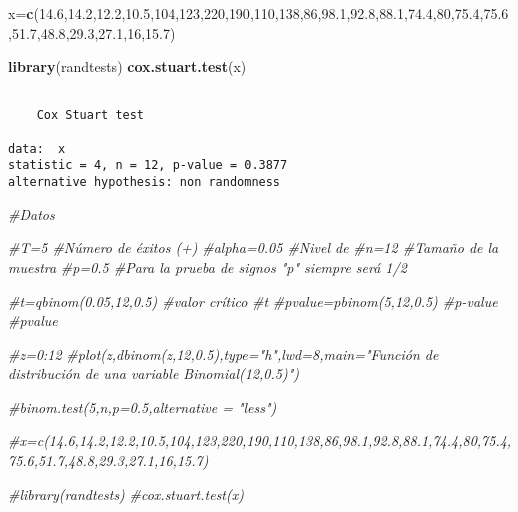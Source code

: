 \documentclass[a4paper,oneside,openany]{book}
\newenvironment{Shaded}{\begin{snugshade}}{\end{snugshade}}
\newcommand{\KeywordTok}[1]{\textcolor[rgb]{0.13,0.29,0.53}{\textbf{#1}}}
\newcommand{\DecValTok}[1]{\textcolor[rgb]{0.00,0.00,0.81}{#1}}
\newcommand{\FloatTok}[1]{\textcolor[rgb]{0.00,0.00,0.81}{#1}}
\newcommand{\CommentTok}[1]{\textcolor[rgb]{0.56,0.35,0.01}{\textit{#1}}}
\newcommand{\NormalTok}[1]{#1}
\begin{document}
\begin{Shaded}
\begin{Highlighting}[]
\NormalTok{x=}\KeywordTok{c}\NormalTok{(}\FloatTok{14.6}\NormalTok{,}\FloatTok{14.2}\NormalTok{,}\FloatTok{12.2}\NormalTok{,}\FloatTok{10.5}\NormalTok{,}\DecValTok{104}\NormalTok{,}\DecValTok{123}\NormalTok{,}\DecValTok{220}\NormalTok{,}\DecValTok{190}\NormalTok{,}\DecValTok{110}\NormalTok{,}\DecValTok{138}\NormalTok{,}\DecValTok{86}\NormalTok{,}\FloatTok{98.1}\NormalTok{,}\FloatTok{92.8}\NormalTok{,}\FloatTok{88.1}\NormalTok{,}\FloatTok{74.4}\NormalTok{,}\DecValTok{80}\NormalTok{,}\FloatTok{75.4}\NormalTok{,}\FloatTok{75.6}\NormalTok{,}\FloatTok{51.7}\NormalTok{,}\FloatTok{48.8}\NormalTok{,}\FloatTok{29.3}\NormalTok{,}\FloatTok{27.1}\NormalTok{,}\DecValTok{16}\NormalTok{,}\FloatTok{15.7}\NormalTok{)}


\KeywordTok{library}\NormalTok{(randtests)}
\KeywordTok{cox.stuart.test}\NormalTok{(x)}
\end{Highlighting}
\end{Shaded}

\begin{verbatim}

    Cox Stuart test

data:  x
statistic = 4, n = 12, p-value = 0.3877
alternative hypothesis: non randomness
\end{verbatim}

\begin{Shaded}
\begin{Highlighting}[]
\CommentTok{#Datos}

\CommentTok{#T=5              #Número de éxitos (+)}
\CommentTok{#alpha=0.05       #Nivel de }
\CommentTok{#n=12              #Tamaño de la muestra }
\CommentTok{#p=0.5            #Para la prueba de signos "p" siempre será 1/2}


\CommentTok{#t=qbinom(0.05,12,0.5)           #valor crítico}
\CommentTok{#t}
\CommentTok{#pvalue=pbinom(5,12,0.5)         #p-value      }
\CommentTok{#pvalue}

\CommentTok{#z=0:12}
\CommentTok{#plot(z,dbinom(z,12,0.5),type="h",lwd=8,main="Función de distribución de una variable Binomial(12,0.5)")}


\CommentTok{#binom.test(5,n,p=0.5,alternative = "less")}

\CommentTok{#x=c(14.6,14.2,12.2,10.5,104,123,220,190,110,138,86,98.1,92.8,88.1,74.4,80,75.4,75.6,51.7,48.8,29.3,27.1,16,15.7)}


\CommentTok{#library(randtests)}
\CommentTok{#cox.stuart.test(x)}
\end{Highlighting}
\end{Shaded}
\end{document}
